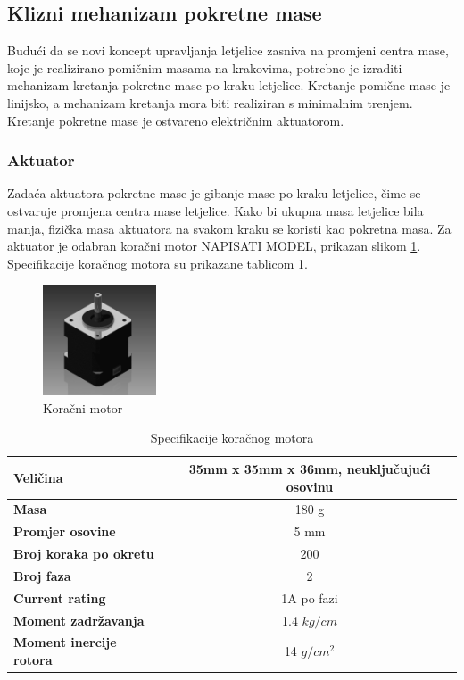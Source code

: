 \documentclass[11pt,a4paper]{article}
\begin{document}
\subsection{Klizni mehanizam pokretne mase}

Budući da se novi koncept upravljanja letjelice zasniva na promjeni centra mase, koje je realizirano pomičnim masama na krakovima, potrebno je izraditi mehanizam kretanja pokretne mase po kraku letjelice. Kretanje pomične mase je linijsko, a mehanizam kretanja mora biti realiziran s minimalnim trenjem. Kretanje pokretne mase je ostvareno električnim aktuatorom.

\subsubsection{Aktuator}
Zadaća aktuatora pokretne mase je gibanje mase po kraku letjelice, čime se ostvaruje promjena centra mase letjelice. Kako bi ukupna masa letjelice bila manja, fizička masa aktuatora na svakom kraku se koristi kao pokretna masa. Za aktuator je odabran koračni motor NAPISATI MODEL, prikazan slikom \ref{fig:stepper_motor}. Specifikacije koračnog motora su prikazane tablicom \ref{tab:specifikacija_steppera}.

\begin{figure}[H]
	\centering
	\includegraphics[width=0.3\textwidth]{figures/StepperMotor.jpg}
	\caption{Koračni motor}
	\label{fig:stepper_motor}
\end{figure}


\begin{table}[H]
	\centering
	\caption{Specifikacije koračnog motora }
	\label{tab:specifikacija_steppera}
	\begin{tabular}{|l|c|}
		\hline
		\textbf{Veličina} & 35mm x 35mm x 36mm, neuključujući osovinu  \\ \hline 
		\textbf{Masa} & 180 g  \\ \hline 
		\textbf{Promjer osovine} & 5 mm \\ \hline 
		\textbf{Broj koraka po okretu} & 200 \\ \hline 
		\textbf{Broj faza} & 2 \\ \hline 
		\textbf{Current rating} & 1A po fazi \\ \hline 
		\textbf{Moment zadržavanja} & 1.4 $kg/cm$ \\ \hline 
		\textbf{Moment inercije rotora} & 14 $g/cm^2$ \\ \hline 
	\end{tabular}
\end{table}
\end{document}
